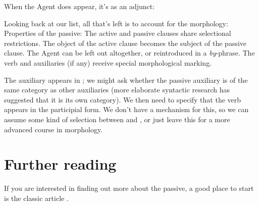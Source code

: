 \documentclass{article}
\begin{document}
When the Agent does appear, it's as an adjunct:
\begin{exe}
    \label{passive-tree}
\end{exe}

Looking back at our list, all that's left is to account for the morphology:
\ea Properties of the passive:
    \ea The active and passive clauses share selectional restrictions.
    \ex The object of the active clause becomes the subject of the passive clause.
    \ex The Agent can be left out altogether, or reintroduced in a \emph{by}-phrase.
    \ex The verb and auxiliaries (if any) receive special morphological marking.
    \z
\z

The auxiliary appears in ; we might ask whether the passive auxiliary is of the same category as other auxiliaries (more elaborate syntactic research has suggested that it is its own category). We then need to specify that the verb appears in the participial form. We don't have a mechanism for this, so we can assume some kind of selection between  and , or just leave this for a more advanced course in morphology.

\section*{Further reading}

If you are interested in finding out more about the passive, a good place to start is the classic article \citet{jaeggli_passive_1986}.

\printbibliography
\end{document}
